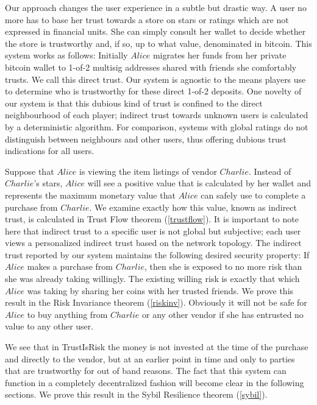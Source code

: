    Our approach changes the user experience in a subtle but drastic way. A user no more has to base her trust towards a
   store on stars or ratings which are not expressed in financial units. She can simply consult her wallet to decide whether
   the store is trustworthy and, if so, up to what value, denominated in bitcoin. This system works as follows: Initially
   $Alice$ migrates her funds from her private bitcoin wallet to 1-of-2 multisig addresses shared with friends she
   comfortably trusts. We call this direct trust. Our system is agnostic to the means players use to determine who is
   trustworthy for these direct 1-of-2 deposits. One novelty of our system is that this dubious kind of trust is confined to
   the direct neighbourhood of each player; indirect trust towards unknown users is calculated by a deterministic algorithm.
   For comparison, systems with global ratings do not distinguish between neighbours and other users, thus offering dubious
   trust indications for all users.

   Suppose that $Alice$ is viewing the item listings of vendor $Charlie$. Instead of $Charlie$'s stars, $Alice$ will see a
   positive value that is calculated by her wallet and represents the maximum monetary value that $Alice$ can safely use to
   complete a purchase from $Charlie$. We examine exactly how this value, known as indirect trust, is calculated in Trust
   Flow theorem (\ref{trustflow}). It is important to note here that indirect trust to a specific user is not global but
   subjective; each user views a personalized indirect trust based on the network topology. The indirect trust reported by
   our system maintains the following desired security property: If $Alice$ makes a purchase from $Charlie$, then she is
   exposed to no more risk than she was already taking willingly. The existing willing risk is exactly that which $Alice$
   was taking by sharing her coins with her trusted friends. We prove this result in the Risk Invariance theorem
   (\ref{riskinv}). Obviously it will not be safe for $Alice$ to buy anything from $Charlie$ or any other vendor if she has
   entrusted no value to any other user.

   We see that in TrustIsRisk the money is not invested at the time of the purchase and directly to the vendor, but at an
   earlier point in time and only to parties that are trustworthy for out of band reasons. The fact that this system can
   function in a completely decentralized fashion will become clear in the following sections. We prove this result in the
   Sybil Resilience theorem (\ref{sybil}).


